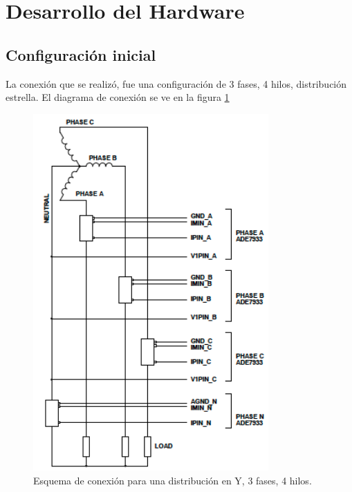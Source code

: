 \section{Desarrollo del Hardware}
    \subsection{Configuración inicial}

        La conexión que se realizó, fue una configuración de 3 fases, 4 hilos, distribución estrella. El diagrama de conexión se ve en la figura \ref{fig:configuracion}

        \begin{figure}[H]
            \begin{center}
                \includegraphics[width = 9cm]{3Proyecto/configuration}
                \caption{ Esquema de conexión para una distribución en Y, 3 fases, 4 hilos.} 
                \label{fig:configuracion}
            \end{center}
        \end{figure}

